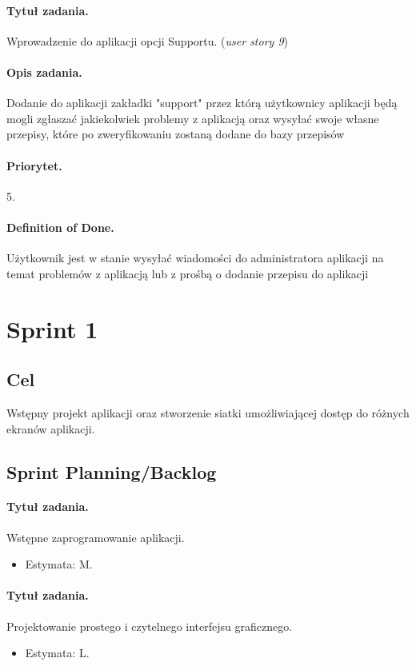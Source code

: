 \documentclass[a4paper]{article}
\begin{document}
\paragraph{Tytuł zadania.} Wprowadzenie do aplikacji opcji Supportu. (\textit{user story 9})
\paragraph{Opis zadania.} Dodanie do aplikacji zakładki "support" przez którą użytkownicy aplikacji będą mogli zgłaszać jakiekolwiek problemy z aplikacją oraz wysyłać swoje własne przepisy, które po zweryfikowaniu zostaną dodane do bazy przepisów
\paragraph{Priorytet.} 5.
\paragraph{Definition of Done.} Użytkownik jest w stanie wysyłać wiadomości do administratora aplikacji na temat problemów z aplikacją lub z prośbą o dodanie przepisu do aplikacji


\section{Sprint 1}
\subsection{Cel} Wstępny projekt aplikacji oraz stworzenie siatki umożliwiającej dostęp do różnych ekranów aplikacji.
\subsection{Sprint Planning/Backlog}

\paragraph{Tytuł zadania.} Wstępne zaprogramowanie aplikacji.
\begin{itemize}
	\item Estymata: M.
\end{itemize}

\paragraph{Tytuł zadania.} Projektowanie prostego i czytelnego interfejsu graficznego.
\begin{itemize}
	\item Estymata: L.
\end{itemize}
\end{document}
